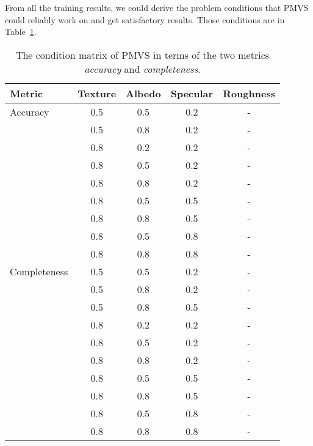 From all the training results, we could derive the problem conditions that PMVS could reliably work on and get satisfactory results. Those conditions are in Table~\ref{tab:mvs_training_result}.
\begin{table}[!htbp]
  \centering
  \begin{tabular}{l*{4}{c}}
  \hline
  \textbf{Metric} & Texture & Albedo & Specular & Roughness\\
  \hline
  Accuracy & 0.5 & 0.5 & 0.2 & -\\
           & 0.5 & 0.8 & 0.2 & -\\
           & 0.8 & 0.2 & 0.2 & -\\
           & 0.8 & 0.5 & 0.2 & -\\
           & 0.8 & 0.8 & 0.2 & -\\
           & 0.8 & 0.5 & 0.5 & -\\
           & 0.8 & 0.8 & 0.5 & -\\
           & 0.8 & 0.5 & 0.8 & -\\
           & 0.8 & 0.8 & 0.8 & -\\
  \hline
  Completeness & 0.5 & 0.5 & 0.2 & -\\
               & 0.5 & 0.8 & 0.2 & -\\
               & 0.5 & 0.8 & 0.5 & -\\
               & 0.8 & 0.2 & 0.2 & -\\
               & 0.8 & 0.5 & 0.2 & -\\
               & 0.8 & 0.8 & 0.2 & -\\
               & 0.8 & 0.5 & 0.5 & -\\
               & 0.8 & 0.8 & 0.5 & -\\
               & 0.8 & 0.5 & 0.8 & -\\
               & 0.8 & 0.8 & 0.8 & -\\
  \hline
  \end{tabular}
  \caption{The condition matrix of PMVS in terms of the two metrics \textit{accuracy} and \textit{completeness}.}
  \label{tab:mvs_training_result}
\end{table}

